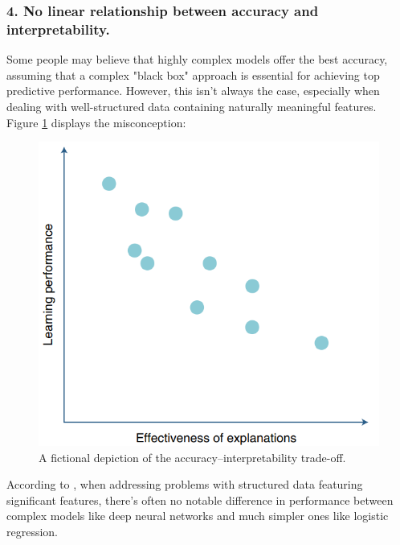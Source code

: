 \subsubsection*{4. No linear relationship between accuracy and interpretability.}
Some people may believe that highly complex models offer the best accuracy, assuming that a complex "black box" approach is essential for achieving top predictive performance. However, this isn't always the case, especially when dealing with well-structured data containing naturally meaningful features. Figure \ref{fig:tradeoff} displays the misconception:

\begin{figure}[H]
    \centering
    \includegraphics[width=0.5\linewidth]{pics/fictional_depiction.png}
    \caption{A fictional depiction of the accuracy–interpretability trade-off.\cite{rudin2019stop}}
    \label{fig:tradeoff}
\end{figure}

According to \cite{rudin2019stop}, when addressing problems with structured data featuring significant features, there's often no notable difference in performance between complex models like deep neural networks and much simpler ones like logistic regression.
